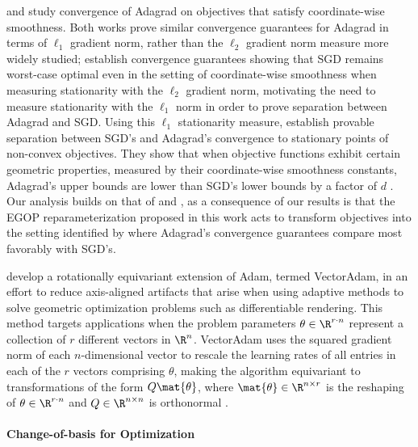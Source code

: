 \citet{jiang2024convergence} and \citet{liu2024adagrad} study convergence of Adagrad on objectives that satisfy coordinate-wise smoothness. Both works prove similar convergence guarantees for Adagrad in terms of $\ell_1$ gradient norm, rather than the $\ell_2$ gradient norm measure more widely studied; \citet{jiang2024convergence} establish convergence guarantees showing that SGD remains worst-case optimal even in the setting of coordinate-wise smoothness when measuring stationarity with the $\ell_2$ gradient norm, motivating the need to measure stationarity with the $\ell_1$ norm in order to prove separation between Adagrad and SGD. Using this $\ell_1$ stationarity measure, \citet{jiang2024convergence} establish provable separation between SGD's and Adagrad's convergence to stationary points of non-convex objectives. They show that when objective functions exhibit certain geometric properties, measured by their coordinate-wise smoothness constants, Adagrad's upper bounds are lower than SGD's lower bounds by a factor of $d$ \cite{jiang2024convergence}. Our analysis builds on that of \citet{jiang2024convergence} and \citet{liu2024adagrad}, as a consequence of our results is that the EGOP reparameterization proposed in this work acts to transform objectives into the setting identified by \citet{jiang2024convergence} where Adagrad's convergence guarantees compare most favorably with SGD's. 

\citet{ling2022vectoradam} develop a rotationally equivariant extension of Adam, termed VectorAdam, in an effort to reduce axis-aligned artifacts that arise when using adaptive methods to solve geometric optimization problems such as differentiable rendering. This method targets applications when the problem parameters $\theta\in \R^{r\cdot n}$ represent a collection of $r$ different vectors in $\R^n$. VectorAdam uses the squared gradient norm of each $n$-dimensional vector to rescale the learning rates of all entries in each of the $r$ vectors comprising $\theta$, making the algorithm equivariant to transformations of the form $Q\mat{\theta}$, where $\mat{\theta}\in \R^{n\times r}$ is the reshaping of $\theta\in \R^{r\cdot n}$ and $Q \in \R^{n\times n}$ is orthonormal \cite{ling2022vectoradam}.

\paragraph{Change-of-basis for Optimization}


